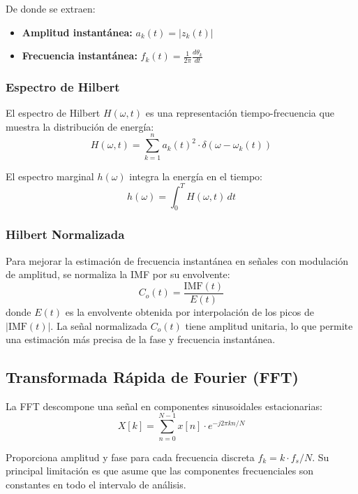 \documentclass[12pt,a4paper]{article}
\begin{document}
De donde se extraen:
\begin{itemize}
    \item \textbf{Amplitud instantánea:} $a_k(t) = |z_k(t)|$
    \item \textbf{Frecuencia instantánea:} $f_k(t) = \frac{1}{2\pi} \frac{d\theta_k}{dt}$
\end{itemize}


\subsubsection{Espectro de Hilbert}

El espectro de Hilbert $H(\omega, t)$ es una representación tiempo-frecuencia que muestra la distribución de energía:
\begin{equation}
H(\omega, t) = \sum_{k=1}^{n} a_k(t)^2 \cdot \delta(\omega - \omega_k(t))
\end{equation}

El espectro marginal $h(\omega)$ integra la energía en el tiempo:
\begin{equation}
h(\omega) = \int_{0}^{T} H(\omega, t) \, dt
\end{equation}

\subsubsection{Hilbert Normalizada}

Para mejorar la estimación de frecuencia instantánea en señales con modulación de amplitud, se normaliza la IMF por su envolvente:
\begin{equation}
C_o(t) = \frac{\text{IMF}(t)}{E(t)}
\end{equation}
donde $E(t)$ es la envolvente obtenida por interpolación de los picos de $|\text{IMF}(t)|$. La señal normalizada $C_o(t)$ tiene amplitud unitaria, lo que permite una estimación más precisa de la fase y frecuencia instantánea.


\subsection{Transformada Rápida de Fourier (FFT)}

La FFT descompone una señal en componentes sinusoidales estacionarias:
\begin{equation}
X[k] = \sum_{n=0}^{N-1} x[n] \cdot e^{-j 2\pi k n / N}
\end{equation}

Proporciona amplitud y fase para cada frecuencia discreta $f_k = k \cdot f_s / N$. Su principal limitación es que asume que las componentes frecuenciales son constantes en todo el intervalo de análisis.
\end{document}
